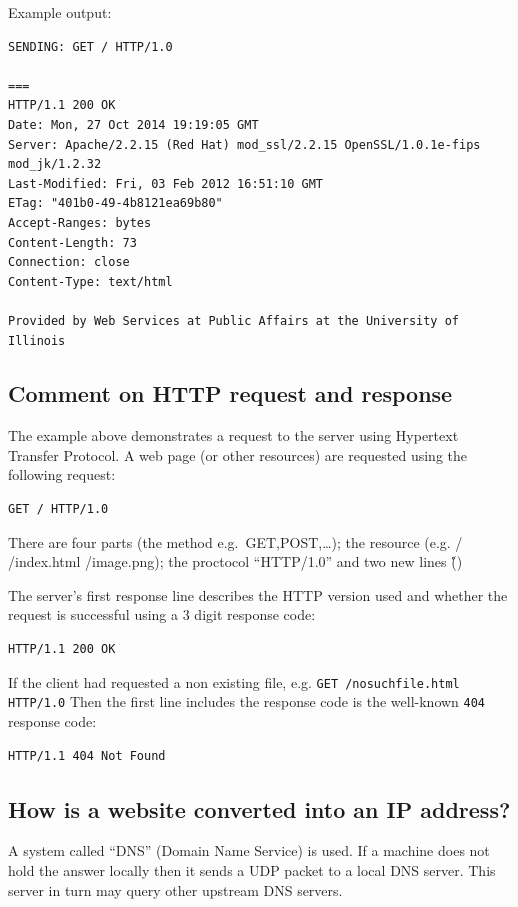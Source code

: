 Example output:

\begin{lstlisting}
SENDING: GET / HTTP/1.0

===
HTTP/1.1 200 OK
Date: Mon, 27 Oct 2014 19:19:05 GMT
Server: Apache/2.2.15 (Red Hat) mod_ssl/2.2.15 OpenSSL/1.0.1e-fips mod_jk/1.2.32
Last-Modified: Fri, 03 Feb 2012 16:51:10 GMT
ETag: "401b0-49-4b8121ea69b80"
Accept-Ranges: bytes
Content-Length: 73
Connection: close
Content-Type: text/html

Provided by Web Services at Public Affairs at the University of Illinois
\end{lstlisting}

\subsection{Comment on HTTP request and response}\label{comment-on-http-request-and-response}

The example above demonstrates a request to the server using Hypertext Transfer Protocol. A web page (or other resources) are requested using the following request:

\begin{lstlisting}
GET / HTTP/1.0
\end{lstlisting}

There are four parts (the method e.g.~GET,POST,\ldots{}); the resource (e.g. / /index.html /image.png); the proctocol ``HTTP/1.0'' and two new lines (\r\n\r\n)

The server's first response line describes the HTTP version used and whether the request is successful using a 3 digit response code:

\begin{lstlisting}
HTTP/1.1 200 OK
\end{lstlisting}

If the client had requested a non existing file, e.g. \texttt{GET /nosuchfile.html HTTP/1.0} Then the first line includes the response code is the well-known \texttt{404} response code:

\begin{lstlisting}
HTTP/1.1 404 Not Found
\end{lstlisting}

\subsection{How is a website converted into an IP address?}

A system called ``DNS'' (Domain Name Service) is used. If a machine does not hold the answer locally then it sends a UDP packet to a local DNS server. This server in turn may query other upstream DNS servers. 

